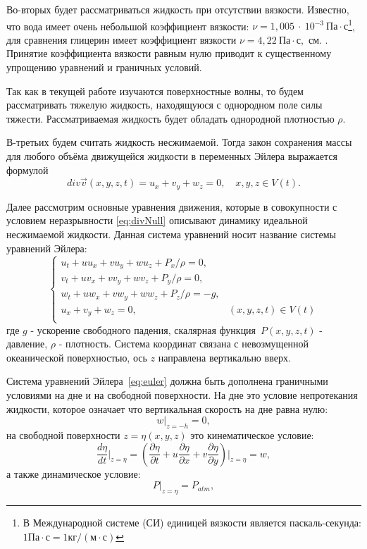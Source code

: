 Во-вторых будет рассматриваться жидкость при отсутствии вязкости. Известно, что  вода имеет очень небольшой коэффициент вязкости:
$\nu=1,005~\cdot~10^{-3}\ \mbox{Па}\cdot\mbox{с}$\footnote{В Международной системе (СИ) единицей вязкости является паскаль-секунда:
$1\mbox{Па}\cdot\mbox{с}=1\mbox{кг}/(\mbox{м}\cdot\mbox{с})$}, для сравнения глицерин имеет коэффициент вязкости $\nu=4,22\ \mbox{Па}\cdot\mbox{с},$ см. \cite{loyts}. Принятие коэффициента вязкости равным нулю приводит к существенному упрощению уравнений и граничных условий.

Так как в текущей работе изучаются поверхностные волны, то будем рассматривать тяжелую жидкость, находящуюся с однородном поле силы тяжести. Рассматриваемая жидкость будет обладать однородной плотностью $\rho$.

В-третьих будем считать жидкость несжимаемой. Тогда закон сохранения массы для любого объёма движущейся жидкости в переменных Эйлера выражается формулой
\begin{equation}\label{eq:divNull}
div\overrightarrow v(x,y,z,t)=u_x+v_y+w_z=0,\quad
x,y,z\in V(t).
\end{equation}

Далее рассмотрим основные уравнения движения, которые в совокупности с условием неразрывности \eqref{eq:divNull} описывают динамику идеальной несжимаемой жидкости. Данная система уравнений носит название системы уравнений Эйлера:
\begin{equation}\label{eq:euler}
\begin{cases}
u_t + uu_x + vu_y + wu_z + P_x/\rho = 0, & \\
v_t + uv_x + vv_y + wv_z + P_y/\rho = 0, & \\
w_t + uw_x + vw_y + ww_z + P_z/\rho = -g, & \\
u_x+v_y+w_z=0, & (x,y,z,t)\in V(t)  \\
\end{cases}
\end{equation}
где $g$ - ускорение свободного падения, скалярная функ\-ция~$P(x,y,z,t)$ - давление, $\rho$ - плотность.
Система координат связана с невозмущенной океанической
поверхностью, ось $z$ направлена вертикально вверх.

Система уравнений Эйлера~\eqref{eq:euler} должна быть дополнена граничными условиями на дне и на свободной поверхности. На дне это условие непротекания жидкости, которое означает что вертикальная скорость на дне равна нулю:
\begin{equation}\label{eq:granUslBottom}
  w{|_{z=-h}}=0,
\end{equation}
на свободной поверхности $z=\eta(x,y,z)$ это кинематическое условие:
\begin{equation}\label{eq:kinematGranUsl}
  {\frac{d\eta}{dt}}{|_{z=\eta}}={(\frac{\partial\eta}{\partial t}+u\frac{\partial\eta}{\partial x}+v\frac{\partial\eta}{\partial y})}|_{z=\eta}=w,
\end{equation}
а также динамическое условие:
\begin{equation}\label{eq:dynGranUsl}
  {P}|_{z=\eta}=P_{atm},
\end{equation}

